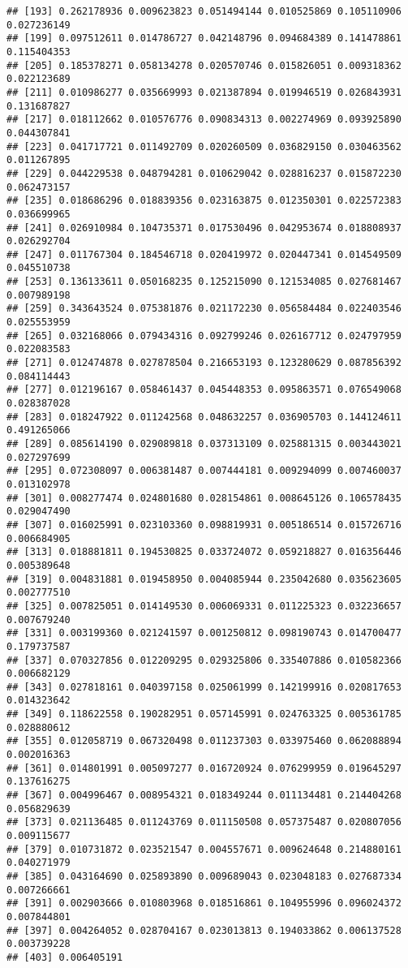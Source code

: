 \documentclass[
]{article}
\begin{document}
\begin{verbatim}
## [193] 0.262178936 0.009623823 0.051494144 0.010525869 0.105110906 0.027236149
## [199] 0.097512611 0.014786727 0.042148796 0.094684389 0.141478861 0.115404353
## [205] 0.185378271 0.058134278 0.020570746 0.015826051 0.009318362 0.022123689
## [211] 0.010986277 0.035669993 0.021387894 0.019946519 0.026843931 0.131687827
## [217] 0.018112662 0.010576776 0.090834313 0.002274969 0.093925890 0.044307841
## [223] 0.041717721 0.011492709 0.020260509 0.036829150 0.030463562 0.011267895
## [229] 0.044229538 0.048794281 0.010629042 0.028816237 0.015872230 0.062473157
## [235] 0.018686296 0.018839356 0.023163875 0.012350301 0.022572383 0.036699965
## [241] 0.026910984 0.104735371 0.017530496 0.042953674 0.018808937 0.026292704
## [247] 0.011767304 0.184546718 0.020419972 0.020447341 0.014549509 0.045510738
## [253] 0.136133611 0.050168235 0.125215090 0.121534085 0.027681467 0.007989198
## [259] 0.343643524 0.075381876 0.021172230 0.056584484 0.022403546 0.025553959
## [265] 0.032168066 0.079434316 0.092799246 0.026167712 0.024797959 0.022083583
## [271] 0.012474878 0.027878504 0.216653193 0.123280629 0.087856392 0.084114443
## [277] 0.012196167 0.058461437 0.045448353 0.095863571 0.076549068 0.028387028
## [283] 0.018247922 0.011242568 0.048632257 0.036905703 0.144124611 0.491265066
## [289] 0.085614190 0.029089818 0.037313109 0.025881315 0.003443021 0.027297699
## [295] 0.072308097 0.006381487 0.007444181 0.009294099 0.007460037 0.013102978
## [301] 0.008277474 0.024801680 0.028154861 0.008645126 0.106578435 0.029047490
## [307] 0.016025991 0.023103360 0.098819931 0.005186514 0.015726716 0.006684905
## [313] 0.018881811 0.194530825 0.033724072 0.059218827 0.016356446 0.005389648
## [319] 0.004831881 0.019458950 0.004085944 0.235042680 0.035623605 0.002777510
## [325] 0.007825051 0.014149530 0.006069331 0.011225323 0.032236657 0.007679240
## [331] 0.003199360 0.021241597 0.001250812 0.098190743 0.014700477 0.179737587
## [337] 0.070327856 0.012209295 0.029325806 0.335407886 0.010582366 0.006682129
## [343] 0.027818161 0.040397158 0.025061999 0.142199916 0.020817653 0.014323642
## [349] 0.118622558 0.190282951 0.057145991 0.024763325 0.005361785 0.028880612
## [355] 0.012058719 0.067320498 0.011237303 0.033975460 0.062088894 0.002016363
## [361] 0.014801991 0.005097277 0.016720924 0.076299959 0.019645297 0.137616275
## [367] 0.004996467 0.008954321 0.018349244 0.011134481 0.214404268 0.056829639
## [373] 0.021136485 0.011243769 0.011150508 0.057375487 0.020807056 0.009115677
## [379] 0.010731872 0.023521547 0.004557671 0.009624648 0.214880161 0.040271979
## [385] 0.043164690 0.025893890 0.009689043 0.023048183 0.027687334 0.007266661
## [391] 0.002903666 0.010803968 0.018516861 0.104955996 0.096024372 0.007844801
## [397] 0.004264052 0.028704167 0.023013813 0.194033862 0.006137528 0.003739228
## [403] 0.006405191
\end{verbatim}
\end{document}
